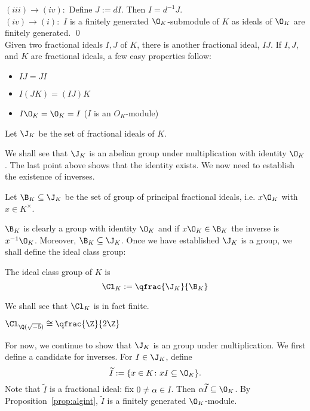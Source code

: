 \noindent $(iii) \to (iv):$ Define $J:=dI$. Then $I=d^{-1}J$. \\

\noindent $(iv) \to (i):$ $I$ is a finitely generated $\O_K$-submodule of $K$ as ideals of $\O_K$ are finitely generated. \qed \\

Given two fractional ideals $I,J$ of $K$, there is another fractional ideal, $IJ$. If $I,J$, and $K$ are fractional ideals, a few easy properties follow:
	\begin{itemize}
	\item $IJ=JI$
	\item $I(JK)=(IJ)K$
	\item $I \O_K=\O_K=I$ ($I$ is an $O_K$-module)
	\end{itemize}

\begin{dfn}
Let $\J_K$ be the set of fractional ideals of $K$.
\end{dfn}

We shall see that $\J_K$ is an abelian group under multiplication with identity $\O_K$. The last point above shows that the identity exists. We now need to establish the existence of inverses. 

\begin{dfn}
Let $\B_K \subseteq \J_K$ be the set of group of principal fractional ideals, i.e. $x \O_K$ with $x \in K^\times$. 
\end{dfn}

$\B_K$ is clearly a group with identity $\O_K$ and if $x\O_K \in \B_K$ the inverse is $x^{-1}\O_K$. Moreover, $\B_K \subseteq \J_K$. Once we have established $\J_K$ is a group, we shall define the ideal class group:

\begin{dfn}
The ideal class group of $K$ is
	\[
	\Cl_K:= \qfrac{\J_K}{\B_K}
	\]
\end{dfn}

We shall see that $\Cl_K$ is in fact finite. 

\begin{ex}
$\Cl_{\Q(\sqrt{-5})} \cong \qfrac{\Z}{2\Z}$ \xqed
\end{ex}

For now, we continue to show that $\J_K$ is an group under multiplication. We first define a candidate for inverses. For $I \in \J_K$, define
	\[
	\widetilde{I}:=  \{ x \in K \colon xI \subseteq \O_K\}.
	\]
Note that $\widetilde{I}$ is a fractional ideal: fix $0 \neq \alpha \in I$. Then $\alpha \widetilde{I} \subseteq \O_K$. By Proposition~\ref{prop:algint}, $\widetilde{I}$ is a finitely generated $\O_K$-module. 

